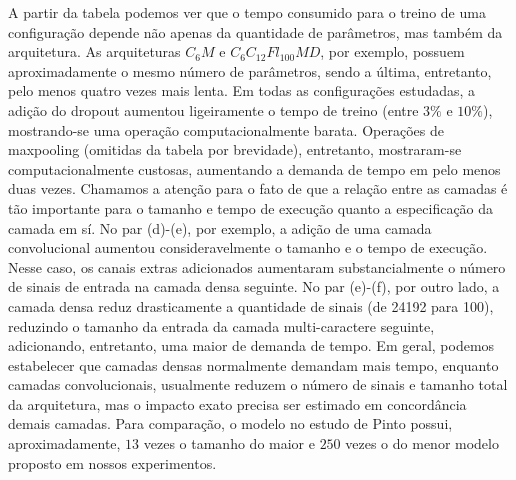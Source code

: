 A partir da tabela podemos ver que o tempo consumido para o treino de uma configuração depende não apenas da quantidade de parâmetros, mas também da arquitetura. As arquiteturas $C_6M$ e $C_6C_{12}Fl_{100}MD$, por exemplo, possuem aproximadamente o mesmo número de parâmetros, sendo a última, entretanto, pelo menos quatro vezes mais lenta. Em todas as configurações estudadas, a adição do dropout aumentou ligeiramente o tempo de treino (entre $3\%$ e $10\%$), mostrando-se uma operação computacionalmente barata. Operações de maxpooling (omitidas da tabela por brevidade), entretanto, mostraram-se computacionalmente custosas, aumentando a demanda de tempo em pelo menos duas vezes. Chamamos a atenção para o fato de que a relação entre as camadas é tão importante para o tamanho e tempo de execução quanto a especificação da camada em sí. No par (d)-(e), por exemplo, a adição de uma camada convolucional aumentou consideravelmente o tamanho e o tempo de execução. Nesse caso, os canais extras adicionados aumentaram substancialmente o número de sinais de entrada na camada densa seguinte. No par (e)-(f), por outro lado, a camada densa reduz drasticamente a quantidade de sinais (de 24192 para 100), reduzindo o tamanho da entrada da camada multi-caractere seguinte, adicionando, entretanto, uma maior de demanda de tempo. Em geral, podemos estabelecer que camadas densas normalmente demandam mais tempo, enquanto camadas convolucionais, usualmente reduzem o número de sinais e tamanho total da arquitetura, mas o impacto exato precisa ser estimado em concordância demais camadas. Para comparação, o modelo no estudo de Pinto possui, aproximadamente, $13$ vezes o tamanho do maior e $250$ vezes o do menor modelo proposto em nossos experimentos.

